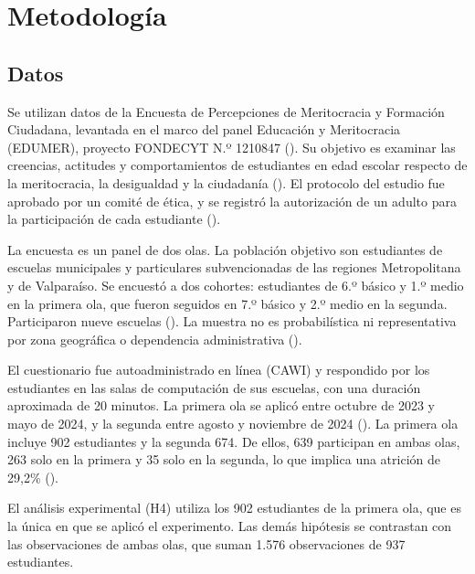 \documentclass[
  spanish,
  a4paper,
  oneside]{scrbook}
\begin{document}

\chapter{Metodología}\label{metodologuxeda}

\section{Datos}\label{datos}

Se utilizan datos de la Encuesta de Percepciones de Meritocracia y
Formación Ciudadana, levantada en el marco del panel Educación y
Meritocracia (EDUMER), proyecto FONDECYT N.º 1210847
().
Su objetivo es examinar las creencias, actitudes y comportamientos de
estudiantes en edad escolar respecto de la meritocracia, la desigualdad
y la ciudadanía ().
El protocolo del estudio fue aprobado por un comité de ética, y se
registró la autorización de un adulto para la participación de cada
estudiante ().

La encuesta es un panel de dos olas. La población objetivo son
estudiantes de escuelas municipales y particulares subvencionadas de las
regiones Metropolitana y de Valparaíso. Se encuestó a dos cohortes:
estudiantes de 6.º básico y 1.º medio en la primera ola, que fueron
seguidos en 7.º básico y 2.º medio en la segunda. Participaron nueve
escuelas (). La
muestra no es probabilística ni representativa por zona geográfica o
dependencia administrativa ().

El cuestionario fue autoadministrado en línea (CAWI) y respondido por
los estudiantes en las salas de computación de sus escuelas, con una
duración aproximada de 20 minutos. La primera ola se aplicó entre
octubre de 2023 y mayo de 2024, y la segunda entre agosto y noviembre de
2024 (). La primera ola incluye 902 estudiantes y la segunda 674. De
ellos, 639 participan en ambas olas, 263 solo en la primera y 35 solo en
la segunda, lo que implica una atrición de 29,2\%
().

El análisis experimental (H4) utiliza los 902 estudiantes de la primera
ola, que es la única en que se aplicó el experimento. Las demás
hipótesis se contrastan con las observaciones de ambas olas, que suman
1.576 observaciones de 937 estudiantes.
\end{document}
